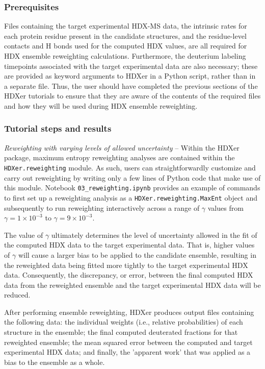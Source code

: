 \documentclass[9pt,tutorial,ASAPversion]{livecoms}
\begin{document}
\subsubsection{Prerequisites}

Files containing the target experimental HDX-MS data, the intrinsic rates for each protein residue present in the candidate structures, and the residue-level contacts and H bonds used for the computed HDX values, are all required for HDX ensemble reweighting calculations. 
Furthermore, the deuterium labeling timepoints associated with the target experimental data are also necessary; these are provided as keyword arguments to HDXer in a Python script, rather than in a separate file. 
Thus, the user should have completed the previous sections of the HDXer tutorials to ensure that they are aware of the contents of the required files and how they will be used during HDX ensemble reweighting. 

\subsubsection{Tutorial steps and results}

\noindent
\textit{Reweighting with varying levels of allowed uncertainty} -- Within the HDXer package, maximum entropy reweighting analyses are contained within the \texttt{HDXer.reweighting} module.
As such, users can straightforwardly customize and carry out reweighting by writing only a few lines of Python code that make use of this module.
Notebook \texttt{03\_reweighting.ipynb} provides an example of commands to first set up a reweighting analysis as a \texttt{HDXer.reweighting.MaxEnt} object and subsequently to run reweighting interactively across a range of $\gamma$ values from $\gamma = 1\times10^{-3}$ to $\gamma = 9\times10^{-3}$.

The value of $\gamma$ ultimately determines the level of uncertainty allowed in the fit of the computed HDX data to the target experimental data. 
That is, higher values of $\gamma$ will cause a larger bias to be applied to the candidate ensemble, resulting in the reweighted data being fitted more tightly to the target experimental HDX data. 
Consequently, the discrepancy, or error, between the final computed HDX data from the reweighted ensemble and the target experimental HDX data will be reduced.

After performing ensemble reweighting, HDXer produces output files containing the following data: the individual weights (i.e., relative probabilities) of each structure in the ensemble; the final computed deuterated fractions for that reweighted ensemble; the mean squared error between the computed and target experimental HDX data; and finally, the 'apparent work' that was applied as a bias to the ensemble as a whole.
\end{document}
